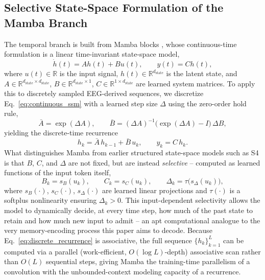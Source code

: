 \documentclass[journal]{IEEEtran}
\begin{document}
\subsection{Selective State-Space Formulation of the Mamba Branch}
The temporal branch is built from Mamba blocks \cite{gu2023mamba}, whose continuous-time formulation is a linear time-invariant state-space model,
\begin{equation}
\dot{h}(t) = A h(t) + B u(t), \qquad y(t) = C h(t),
\label{eq:continuous_ssm}
\end{equation}
where $u(t) \in \mathbb{R}$ is the input signal, $h(t) \in \mathbb{R}^{d_{\mathrm{state}}}$ is the latent state, and $A \in \mathbb{R}^{d_{\mathrm{state}} \times d_{\mathrm{state}}}$, $B \in \mathbb{R}^{d_{\mathrm{state}} \times 1}$, $C \in \mathbb{R}^{1 \times d_{\mathrm{state}}}$ are learned system matrices. To apply this to discretely sampled EEG-derived sequences, we discretize Eq.~\eqref{eq:continuous_ssm} with a learned step size $\Delta$ using the zero-order hold rule,
\begin{equation}
\bar{A} = \exp(\Delta A), \qquad \bar{B} = (\Delta A)^{-1}\big(\exp(\Delta A) - I\big)\,\Delta B,
\label{eq:discretization}
\end{equation}
yielding the discrete-time recurrence
\begin{equation}
h_k = \bar{A}\, h_{k-1} + \bar{B}\, u_k, \qquad y_k = C\, h_k .
\label{eq:discrete_recurrence}
\end{equation}
What distinguishes Mamba from earlier structured state-space models such as S4 \cite{gu2022efficiently} is that $B$, $C$, and $\Delta$ are not fixed, but are instead \emph{selective} -- computed as learned functions of the input token itself,
\begin{equation}
B_k = s_B(u_k), \qquad C_k = s_C(u_k), \qquad \Delta_k = \tau\big(s_{\Delta}(u_k)\big),
\label{eq:selection}
\end{equation}
where $s_B(\cdot)$, $s_C(\cdot)$, $s_{\Delta}(\cdot)$ are learned linear projections and $\tau(\cdot)$ is a softplus nonlinearity ensuring $\Delta_k > 0$. This input-dependent selectivity allows the model to dynamically decide, at every time step, how much of the past state to retain and how much new input to admit -- an apt computational analogue to the very memory-encoding process this paper aims to decode. Because Eq.~\eqref{eq:discrete_recurrence} is associative, the full sequence $\{h_k\}_{k=1}^{L}$ can be computed via a parallel (work-efficient, $O(\log L)$-depth) associative scan rather than $O(L)$ sequential steps, giving Mamba the training-time parallelism of a convolution with the unbounded-context modeling capacity of a recurrence.
\end{document}
